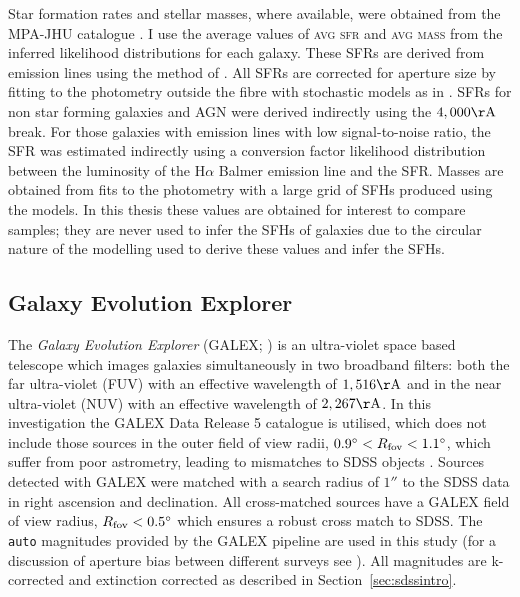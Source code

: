 Star formation rates and stellar masses, where available, were obtained from the MPA-JHU catalogue \citep{kauffmann03, brinchmann04}.  I use the average values of \textsc{avg sfr} and \textsc{avg mass} from the inferred likelihood distributions for each galaxy. These SFRs are derived from emission lines using the method of \cite{charlot01}. All SFRs are corrected for aperture size by fitting to the photometry outside the fibre with stochastic models as in \cite{Salim07}. SFRs for non star forming galaxies and AGN were derived indirectly using the $4,000 \rm{\AA}$ break. For those galaxies with emission lines with low signal-to-noise ratio, the SFR was estimated indirectly using a conversion factor likelihood distribution between the luminosity of the H$\alpha$ Balmer emission line and the SFR. Masses are obtained from fits to the photometry with a large grid of SFHs produced using the \cite{BC03} models. In this thesis these values are obtained for interest to compare samples; they are never used to infer the SFHs of galaxies due to the circular nature of the modelling used to derive these values and infer the SFHs.

\subsection{Galaxy Evolution Explorer}\label{sec:galexintro}

The \emph{Galaxy Evolution Explorer} (GALEX; \citealt{Martin05}) is an ultra-violet space based telescope which images galaxies simultaneously in two broadband filters: both the far ultra-violet (FUV) with an effective wavelength of $1,516 \rm{\AA}$ and in the near ultra-violet (NUV) with an effective wavelength of $2,267 \rm{\AA}$. {\minor In this investigation the GALEX Data Release 5 catalogue \citep[][accessed via the virtual observatory using the TOPCAT application]{bianchi11} is utilised, which does not include those sources in the outer field of view radii, $0.9^\circ < R_{\rm{fov}} < 1.1^\circ$, which suffer from poor astrometry, leading to mismatches to SDSS objects \citep[see][]{?,?}.} Sources detected with GALEX were matched with a search radius of $1''$ to the SDSS data in right ascension and declination. {\minor All cross-matched sources have a GALEX field of view radius, $R_{\rm{fov}} < 0.5^\circ$ which ensures a robust cross match to SDSS}. The {\tt auto} magnitudes provided by the GALEX pipeline are used in this study (for a discussion of aperture bias between different surveys see \citealt{hill11}). All magnitudes are k-corrected and extinction corrected as described in Section~\ref{sec:sdssintro}.

